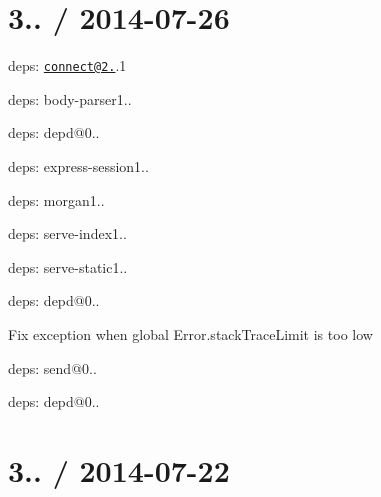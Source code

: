 {\ttfamily \section*{3.. / 2014-\/07-\/26 }}

{\ttfamily }

{\ttfamily 
\begin{DoxyItemize}
\item deps\+: \href{mailto:connect@2.24}{\tt connect@2.}.1
\begin{DoxyItemize}
\item deps\+: body-\/parser1..
\item deps\+: depd@0..
\item deps\+: express-\/session1..
\item deps\+: morgan1..
\item deps\+: serve-\/index1..
\item deps\+: serve-\/static1..
\end{DoxyItemize}
\item deps\+: depd@0..
\begin{DoxyItemize}
\item Fix exception when global {\ttfamily Error.\+stack\+Trace\+Limit} is too low
\end{DoxyItemize}
\item deps\+: send@0..
\begin{DoxyItemize}
\item deps\+: depd@0..
\end{DoxyItemize}
\end{DoxyItemize}}

{\ttfamily \section*{3.. / 2014-\/07-\/22 }}

{\ttfamily }

